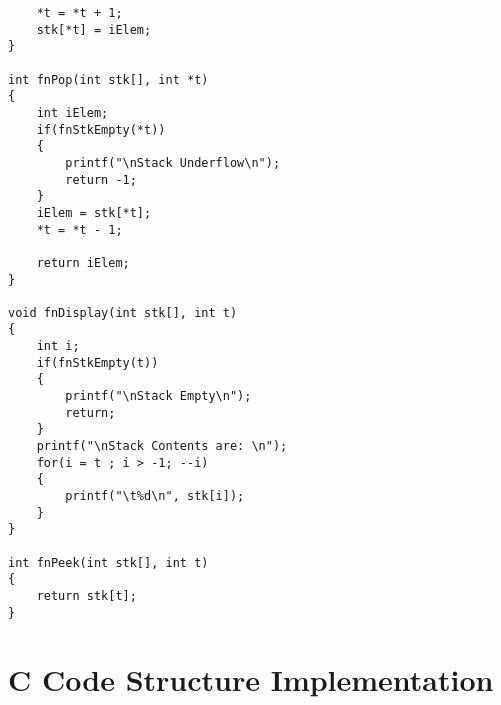 \begin{Verbatim}
	*t = *t + 1;
	stk[*t] = iElem;
}

int fnPop(int stk[], int *t)
{
	int iElem;
	if(fnStkEmpty(*t))
	{
		printf("\nStack Underflow\n");
		return -1;
	}
	iElem = stk[*t];
	*t = *t - 1;
	
	return iElem;
}

void fnDisplay(int stk[], int t)
{
	int i;
	if(fnStkEmpty(t))
	{
		printf("\nStack Empty\n");
		return;
	}
	printf("\nStack Contents are: \n");
	for(i = t ; i > -1; --i)
	{
		printf("\t%d\n", stk[i]);
	}
}

int fnPeek(int stk[], int t)
{
	return stk[t];
}

\end{Verbatim}

\section*{C Code Structure Implementation}

